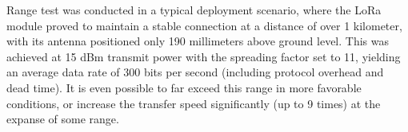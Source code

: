 Range test was conducted in a typical deployment scenario, where the LoRa module proved to maintain a stable connection at a distance of over 1 kilometer, with its antenna positioned only 190 millimeters above ground level. This was achieved at 15 dBm transmit power with the spreading factor set to 11, yielding an average data rate of 300 bits per second (including protocol overhead and dead time). It is even possible to far exceed this range in more favorable conditions, or increase the transfer speed significantly (up to 9 times) at the expanse of some range.
